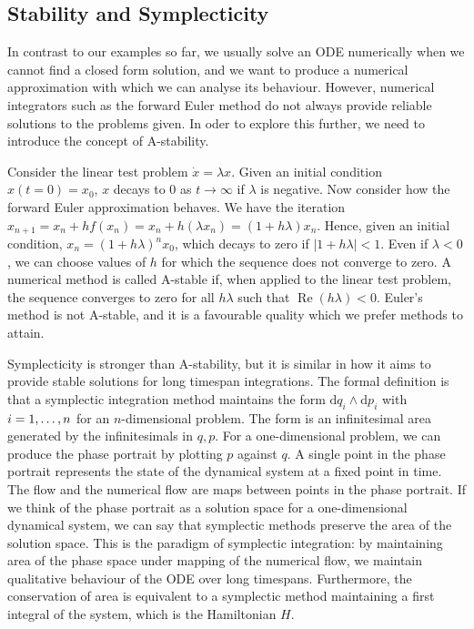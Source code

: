 \documentclass{report}
\begin{document}
\subsection{Stability and Symplecticity}
In contrast to our examples so far, we usually solve an ODE numerically when we cannot find a closed form solution, and we want to produce a numerical approximation with which we can analyse its behaviour.
However, numerical integrators such as the forward Euler method do not always provide reliable solutions to the problems given.
In oder to explore this further, we need to introduce the concept of A-stability.

Consider the linear test problem $\dot{x} = \lambda x$. Given an initial condition $x(t=0) = x_0$, $x$ decays to $0$ as $t \rightarrow \infty$ if $\lambda$ is negative.
Now consider how the forward Euler approximation behaves.
We have the iteration $x_{n+1} = x_n + hf(x_n) = x_n + h(\lambda x_n) = (1 + h\lambda)x_n$.
Hence, given an initial condition, $x_n = (1 + h\lambda)^n x_0$, which decays to zero if $|1+h\lambda| < 1$.
Even if $\lambda < 0$, we can choose values of $h$ for which the sequence does not converge to zero.
A numerical method is called A-stable if, when applied to the linear test problem, the sequence converges to zero for all $h\lambda$ such that $\operatorname{Re}(h\lambda) < 0$.
Euler's method is not A-stable, and it is a favourable quality which we prefer methods to attain.

Symplecticity is stronger than A-stability, but it is similar in how it aims to provide stable solutions for long timespan integrations.
The formal definition is that a symplectic integration method maintains the form $\mathrm{d}q_i \wedge \mathrm{d}p_i$ with $i = 1, \mathellipsis, n$ for an $n$-dimensional problem.
The form is an infinitesimal area generated by the infinitesimals in $q, p$.
For a one-dimensional problem, we can produce the phase portrait by plotting $p$ against $q$.
A single point in the phase portrait represents the state of the dynamical system at a fixed point in time.
The flow and the numerical flow are maps between points in the phase portrait.
If we think of the phase portrait as a solution space for a one-dimensional dynamical system, we can say that symplectic methods preserve the area of the solution space.
This is the paradigm of symplectic integration: by maintaining area of the phase space under mapping of the numerical flow, we maintain qualitative behaviour of the ODE over long timespans.
Furthermore, the conservation of area is equivalent to a symplectic method maintaining a first integral of the system, which is the Hamiltonian $H$.
\end{document}
